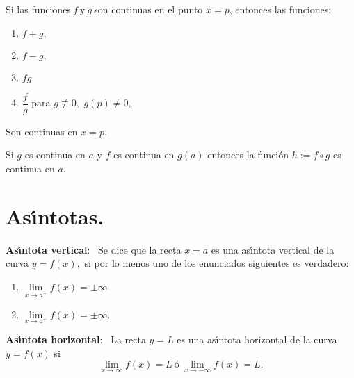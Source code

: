 \begin{theorem}
\label{a5}Si las funciones$\ f\ $y$\ g\ $son continuas en el punto $x=p$,
entonces las funciones:

\begin{enumerate}
\item $f+g,$

\item $f-g,$

\item $fg,$

\item $\dfrac{f}{g}$ para $g\not \equiv 0,$ $g\left(  p\right)  \neq0,$
\end{enumerate}

Son continuas en\emph{ }$x=p.$
\end{theorem}

\begin{theorem}
\label{a10}Si $g$ es continua en $a$ y $f$ es continua en $g(a)$ entonces la
funci\'{o}n $h:=f\circ g$ es continua en $a$.
\end{theorem}

\section{As\'{\i}ntotas.%
%
}

\begin{definition}{\textbf{As\'{\i}ntota vertical}:\ }
%
Se dice que la recta $x=a$ es una as\'{\i}ntota vertical de la curva $y=f(x),$
si por lo menos uno de los enunciados siguientes es verdadero:

\begin{enumerate}
\item $\lim\limits_{x\rightarrow a^{+}}f(x)=\pm\infty$

\item $\lim\limits_{x\rightarrow a^{-}}f(x)=\pm\infty.$
\end{enumerate}
\end{definition}

\begin{definition}
{\textbf{As\'{\i}ntota horizontal}:\ }%
%
La recta $y=L$ es una as\'{\i}ntota horizontal de la curva $y=f(x)$ si
\[
\lim\limits_{x\rightarrow\infty}f(x)=L\ \text{\'{o}}\ \lim
\limits_{x\rightarrow-\infty}f(x)=L.
\]

\end{definition}


